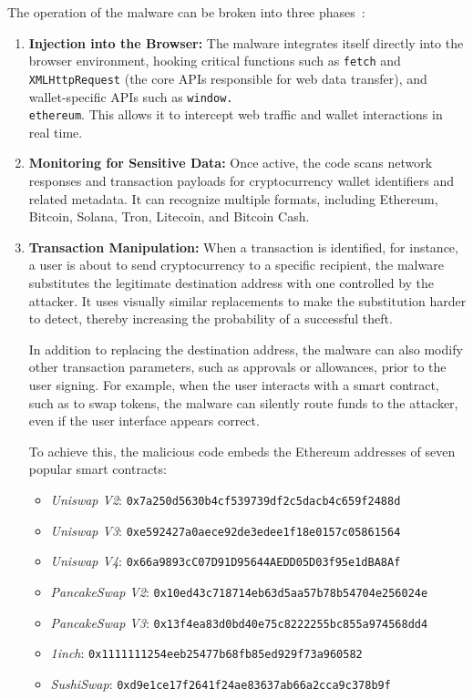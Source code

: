 The operation of the malware can be broken into three phases~\cite{henig2025breakdownwidespreadnpmsupplychainattack}:
\begin{enumerate}
    \item \textbf{Injection into the Browser:}
    The malware integrates itself directly into the browser environment, 
    hooking critical functions such as \texttt{fetch} and \texttt{XMLHttpRequest}
    (the core \acp{API} responsible for web data transfer), 
    and wallet-specific \acp{API} such as \texttt{window.\\ ethereum}.
    This allows it to intercept web traffic and wallet interactions in real time.

    \item \textbf{Monitoring for Sensitive Data:}
    Once active, the code scans network responses and transaction payloads for 
    cryptocurrency wallet identifiers and related metadata. 
    It can recognize multiple formats, including Ethereum, Bitcoin, Solana, Tron, Litecoin, and Bitcoin Cash.

    \item \textbf{Transaction Manipulation:}
    When a transaction is identified, for instance, a user is about to send cryptocurrency to a specific recipient,
    the malware substitutes the legitimate destination address with one controlled by the attacker. 
    It uses visually similar replacements to make the substitution harder to detect,
    thereby increasing the probability of a successful theft.

    In addition to replacing the destination address,
    the malware can also modify other transaction parameters, 
    such as approvals or allowances, prior to the user signing.
    For example, when the user interacts with a smart contract, such as to swap tokens,
    the malware can silently route funds to the attacker, even if the user interface appears correct.

    To achieve this, the malicious code embeds the Ethereum addresses of seven popular smart contracts:
    \begin{itemize}
        \item \emph{Uniswap V2}: \texttt{0x7a250d5630b4cf539739df2c5dacb4c659f2488d}
        \item \emph{Uniswap V3}: \texttt{0xe592427a0aece92de3edee1f18e0157c05861564}
        \item \emph{Uniswap V4}: \texttt{0x66a9893cC07D91D95644AEDD05D03f95e1dBA8Af}
        \item \emph{PancakeSwap V2}: \texttt{0x10ed43c718714eb63d5aa57b78b54704e256024e}
        \item \emph{PancakeSwap V3}: \texttt{0x13f4ea83d0bd40e75c8222255bc855a974568dd4}
        \item \emph{1inch}: \texttt{0x1111111254eeb25477b68fb85ed929f73a960582}
        \item \emph{SushiSwap}: \texttt{0xd9e1ce17f2641f24ae83637ab66a2cca9c378b9f}
    \end{itemize}
    
\end{enumerate}

